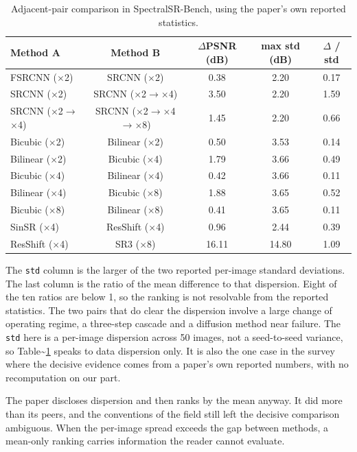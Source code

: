 \documentclass[pdflatex,sn-nature]{sn-jnl}
\newlength{\tblavail}
\begin{document}
\begin{table}[htbp]
\centering
\small
\setlength{\tabcolsep}{3pt}
\setlength{\tblavail}{\dimexpr\textwidth-10\tabcolsep\relax}
\begin{tabular}{lcccc}
\hline
Method A & Method B & $\Delta$PSNR (dB) & max std (dB) & $\Delta$ / std \\
\hline
FSRCNN ($\times$2) & SRCNN ($\times$2) & 0.38 & 2.20 & 0.17 \\
SRCNN ($\times$2) & SRCNN ($\times$2$\rightarrow$$\times$4) & 3.50 & 2.20 & 1.59 \\
SRCNN ($\times$2$\rightarrow$$\times$4) & SRCNN ($\times$2$\rightarrow$$\times$4$\rightarrow$$\times$8) & 1.45 & 2.20 & 0.66 \\
Bicubic ($\times$2) & Bilinear ($\times$2) & 0.50 & 3.53 & 0.14 \\
Bilinear ($\times$2) & Bicubic ($\times$4) & 1.79 & 3.66 & 0.49 \\
Bicubic ($\times$4) & Bilinear ($\times$4) & 0.42 & 3.66 & 0.11 \\
Bilinear ($\times$4) & Bicubic ($\times$8) & 1.88 & 3.65 & 0.52 \\
Bicubic ($\times$8) & Bilinear ($\times$8) & 0.41 & 3.65 & 0.11 \\
SinSR ($\times$4) & ResShift ($\times$4) & 0.96 & 2.44 & 0.39 \\
ResShift ($\times$4) & SR3 ($\times$8) & 16.11 & 14.80 & 1.09 \\
\hline
\end{tabular}
\caption{Adjacent-pair comparison in SpectralSR-Bench, using the paper's own reported statistics.}\label{tab:srbench}
\end{table}

The \texttt{std} column is the larger of the two reported per-image standard deviations. The last column is the ratio of the mean difference to that dispersion. Eight of the ten ratios are below 1, so the ranking is not resolvable from the reported statistics. The two pairs that do clear the dispersion involve a large change of operating regime, a three-step cascade and a diffusion method near failure. The \texttt{std} here is a per-image dispersion across 50 images, not a seed-to-seed variance, so Table\textasciitilde{}\ref{tab:srbench} speaks to data dispersion only. It is also the one case in the survey where the decisive evidence comes from a paper's own reported numbers, with no recomputation on our part.

The paper discloses dispersion and then ranks by the mean anyway. It did more than its peers, and the conventions of the field still left the decisive comparison ambiguous. When the per-image spread exceeds the gap between methods, a mean-only ranking carries information the reader cannot evaluate.
\end{document}
